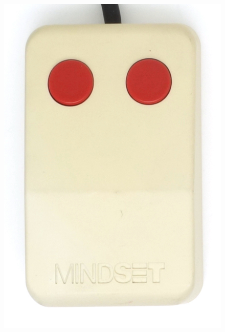 \documentclass[11pt, a4paper]{article}
\begin{document}
\begin{figure}[h]
    \centering
    \includegraphics[scale=0.55]{1984_mindset_mouse/top_30.jpg}

\end{figure}
\end{document}
